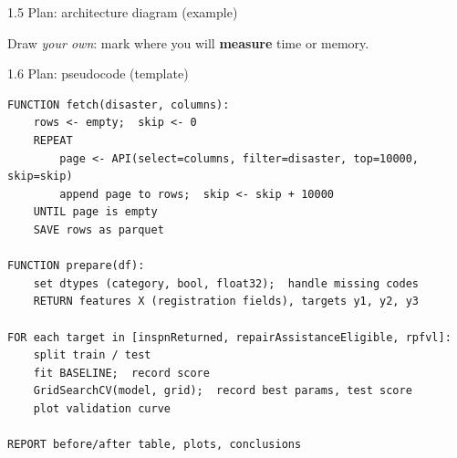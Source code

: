 \documentclass[aspectratio=43,11pt]{beamer}
\begin{document}
\begin{frame}{1.5 Plan: architecture diagram (example)}
  \centering
  \par
  \vspace{0.8em}
  \raggedright
  \small Draw \emph{your own}: mark where you will \textbf{measure} time or memory.
\end{frame}

\begin{frame}[fragile]{1.6 Plan: pseudocode (template)}
\begin{lstlisting}
FUNCTION fetch(disaster, columns):
    rows <- empty;  skip <- 0
    REPEAT
        page <- API(select=columns, filter=disaster, top=10000, skip=skip)
        append page to rows;  skip <- skip + 10000
    UNTIL page is empty
    SAVE rows as parquet

FUNCTION prepare(df):
    set dtypes (category, bool, float32);  handle missing codes
    RETURN features X (registration fields), targets y1, y2, y3

FOR each target in [inspnReturned, repairAssistanceEligible, rpfvl]:
    split train / test
    fit BASELINE;  record score
    GridSearchCV(model, grid);  record best params, test score
    plot validation curve

REPORT before/after table, plots, conclusions
\end{lstlisting}
\end{frame}
\end{document}
